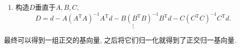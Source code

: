 \begin{enumerate}
    \item 构造$D$垂直于$A,B,C$,
    \begin{equation}
      D = d - A\left( A^{\mathrm{T}}A \right) ^{-1}A^{\mathrm{T}} d - B\left( B^{\mathrm{T}}B \right) ^{-1} B^{\mathrm{T}} d - C\left( C^{\mathrm{T}}C \right)^{-1}C^{\mathrm{T}} d. 
    \end{equation}
    $$
    \vdots
    $$
\end{enumerate}
最终可以得到一组正交的基向量, 之后将它们归一化就得到了正交归一基向量.